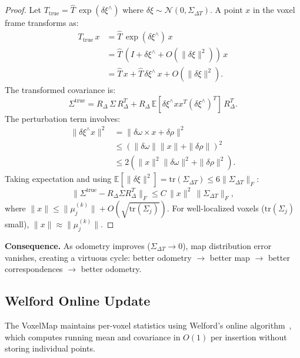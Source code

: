 \documentclass[journal,letterpaper,10pt]{IEEEtran}
\begin{document}
\begin{proof}
Let $T_{\mathrm{true}} = \hat{T}\,\exp(\delta\xi^\wedge)$ where
$\delta\xi \sim \mathcal{N}(0, \Sigma_{\Delta T})$.
A point $x$ in the voxel frame transforms as:
\begin{align}
  T_{\mathrm{true}}\,x &= \hat{T}\,\exp(\delta\xi^\wedge)\,x \nonumber\\
  &= \hat{T}\,(I + \delta\xi^\wedge + O(\|\delta\xi\|^2))\,x \nonumber\\
  &= \hat{T}\,x + \hat{T}\,\delta\xi^\wedge\,x + O(\|\delta\xi\|^2).
\end{align}
The transformed covariance is:
\begin{equation}
  \Sigma^{\mathrm{true}} = R_\Delta\,\Sigma\,R_\Delta^T
  + R_\Delta\,\mathbb{E}[\delta\xi^\wedge x x^T
  (\delta\xi^\wedge)^T]\,R_\Delta^T.
\end{equation}
The perturbation term involves:
\begin{align}
  \|\delta\xi^\wedge x\|^2 &= \|\delta\omega \times x + \delta\rho\|^2 \nonumber\\
  &\leq (\|\delta\omega\|\|x\| + \|\delta\rho\|)^2 \nonumber\\
  &\leq 2(\|x\|^2\|\delta\omega\|^2 + \|\delta\rho\|^2).
\end{align}
Taking expectation and using $\mathbb{E}[\|\delta\xi\|^2] = \mathrm{tr}(\Sigma_{\Delta T})
\leq 6\|\Sigma_{\Delta T}\|_F$:
\begin{equation}
  \|\Sigma^{\mathrm{true}} - R_\Delta\Sigma R_\Delta^T\|_F
  \leq C\,\|x\|^2\,\|\Sigma_{\Delta T}\|_F,
\end{equation}
where $\|x\| \leq \|\mu_j^{(k)}\| + O(\sqrt{\mathrm{tr}(\Sigma_j)})$.
For well-localized voxels ($\mathrm{tr}(\Sigma_j)$ small),
$\|x\| \approx \|\mu_j^{(k)}\|$.
\end{proof}

\textbf{Consequence.}
As odometry improves ($\Sigma_{\Delta T} \to 0$), map distribution error
vanishes, creating a virtuous cycle: better odometry $\to$ better map $\to$
better correspondences $\to$ better odometry.

\subsection{Welford Online Update}\label{app:welford}

The VoxelMap maintains per-voxel statistics using Welford's online
algorithm~\cite{welford1962note}, which computes running mean and
covariance in $O(1)$ per insertion without storing individual points.
\end{document}
